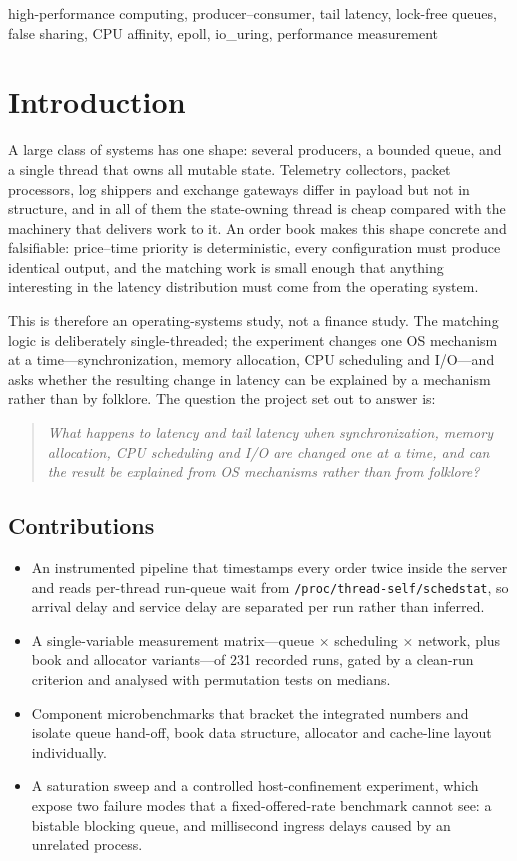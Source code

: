 \documentclass[conference]{IEEEtran}
\begin{document}
\begin{IEEEkeywords}
high-performance computing, producer--consumer, tail latency, lock-free queues,
false sharing, CPU affinity, epoll, io\_uring, performance measurement
\end{IEEEkeywords}

\section{Introduction}

A large class of systems has one shape: several producers, a bounded queue, and
a single thread that owns all mutable state. Telemetry collectors, packet
processors, log shippers and exchange gateways differ in payload but not in
structure, and in all of them the state-owning thread is cheap compared with the
machinery that delivers work to it. An order book makes this shape concrete and
falsifiable: price--time priority is deterministic, every configuration must
produce identical output, and the matching work is small enough that anything
interesting in the latency distribution must come from the operating system.

This is therefore an operating-systems study, not a finance study. The matching
logic is deliberately single-threaded; the experiment changes one OS mechanism
at a time---synchronization, memory allocation, CPU scheduling and I/O---and
asks whether the resulting change in latency can be explained by a mechanism
rather than by folklore. The question the project set out to answer is:

\begin{quote}
\itshape What happens to latency and tail latency when synchronization, memory
allocation, CPU scheduling and I/O are changed one at a time, and can the result
be explained from OS mechanisms rather than from folklore?
\end{quote}

\subsection{Contributions}
\begin{itemize}
\item An instrumented pipeline that timestamps every order twice inside the
server and reads per-thread run-queue wait from
\texttt{/proc/thread-self/schedstat}, so arrival delay and service delay are
separated per run rather than inferred.
\item A single-variable measurement matrix---queue $\times$ scheduling $\times$
network, plus book and allocator variants---of 231 recorded runs, gated by a
clean-run criterion and analysed with permutation tests on medians.
\item Component microbenchmarks that bracket the integrated numbers and isolate
queue hand-off, book data structure, allocator and cache-line layout
individually.
\item A saturation sweep and a controlled host-confinement experiment, which
expose two failure modes that a fixed-offered-rate benchmark cannot see: a
bistable blocking queue, and millisecond ingress delays caused by an unrelated
process.
\end{itemize}
\end{document}

